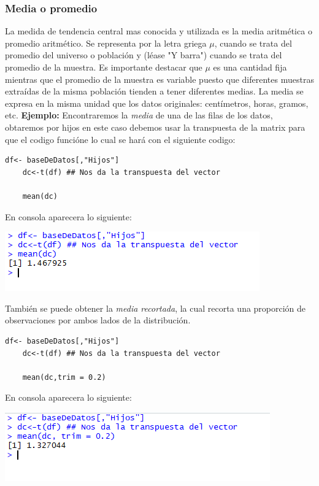 \documentclass[12pt,hidelinks]{article}
\begin{document}
	\subsubsection{Media o promedio} La medida de tendencia central mas conocida y utilizada es la media aritmética o promedio aritmético. Se representa por la letra griega $\mu$, cuando se trata del promedio del universo o población y (léase "Y barra") cuando se trata del promedio de la muestra. Es importante destacar que $\mu$ es una cantidad fija mientras que el promedio de la muestra es variable puesto que diferentes muestras extraídas de la misma población tienden a tener diferentes medias. La media se expresa en la misma unidad que los datos originales: centímetros, horas, gramos, etc.\newline
	\textbf{Ejemplo:}
	\vspace{1mm}
	Encontraremos la \textit{media} de una de las filas de los datos, obtaremos por hijos  en este caso debemos usar la transpuesta de la matrix para que el codigo funcióne lo cual se hará con el siguiente codigo:
	\begin{lstlisting}[frame=single]
	df<- baseDeDatos[,"Hijos"]
	dc<-t(df) ## Nos da la transpuesta del vector
	
	mean(dc)
	\end{lstlisting}
	En consola aparecera lo siguiente:
	\begin{center}
		\includegraphics[]{media.PNG}
	\end{center}
	También se puede obtener la \textit{media recortada}, la cual recorta una proporción de observaciones por ambos lados de la distribución.
	\begin{lstlisting}[frame=single]
	df<- baseDeDatos[,"Hijos"]
	dc<-t(df) ## Nos da la transpuesta del vector
	
	mean(dc,trim = 0.2)
	\end{lstlisting}
	En consola aparecera lo siguiente:
	\begin{center}
		\includegraphics[]{mediaR.PNG}
	\end{center}
\end{document}
